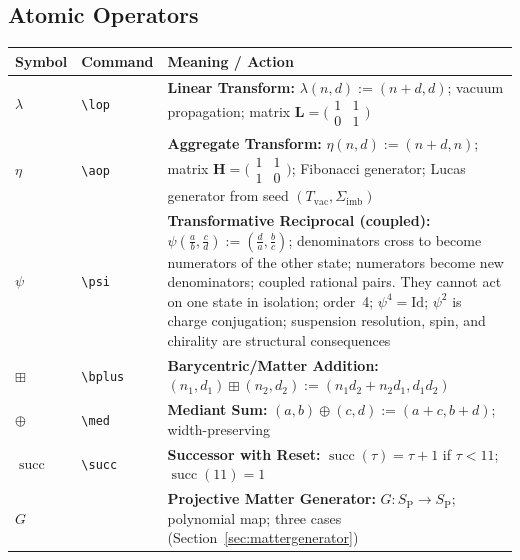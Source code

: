 \documentclass[11pt, letterpaper]{article}
\newcommand{\SP}{S_{\mathrm{P}}}
\newcommand{\lop}{\lambda}
\newcommand{\aop}{\eta}
\newcommand{\bplus}{\boxplus}
\newcommand{\med}{\oplus}
\renewcommand{\succ}{\operatorname{succ}}
\newcommand{\Sigimb}{\Sigma_{\mathrm{imb}}}
\theoremstyle{definition}
\theoremstyle{plain}
\begin{document}
\subsection{Atomic Operators}

\begin{longtable}{L{2.0cm} L{2.6cm} L{8.5cm}}
\toprule
\textbf{Symbol} & \textbf{Command} & \textbf{Meaning / Action} \\
\midrule\endhead\bottomrule\endfoot

$\lop$ & \verb|\lop| & \textbf{Linear Transform:}
  $\lop(n,d):=(n+d,d)$; vacuum propagation;
  matrix $\mathbf{L}=\bigl(\begin{smallmatrix}1&1\\0&1\end{smallmatrix}\bigr)$
  \\[3pt]

$\aop$ & \verb|\aop| & \textbf{Aggregate Transform:}
  $\aop(n,d):=(n+d,n)$;
  matrix $\mathbf{H}=\bigl(\begin{smallmatrix}1&1\\1&0\end{smallmatrix}\bigr)$;
  Fibonacci generator; Lucas generator from seed $(T_{\mathrm{vac}},\Sigimb)$
  \\[3pt]

$\psi$ & \verb|\psi| & \textbf{Transformative Reciprocal (coupled):}
  $\psi\!\left(\tfrac{a}{b},\tfrac{c}{d}\right):=\left(\tfrac{d}{a},\tfrac{b}{c}\right)$;
  denominators cross to become numerators of the other state;
  numerators become new denominators;
  coupled rational pairs. They cannot act on one state in isolation;
  order~4; $\psi^4=\mathrm{Id}$; $\psi^2$ is charge conjugation;
  suspension resolution, spin, and chirality are structural consequences \\[3pt]


$\bplus$ & \verb|\bplus| & \textbf{Barycentric/Matter Addition:}
  $(n_1,d_1)\bplus(n_2,d_2):=(n_1 d_2+n_2 d_1,d_1 d_2)$ \\[3pt]

$\med$ & \verb|\med| & \textbf{Mediant Sum:}
  $(a,b)\med(c,d):=(a+c,b+d)$; width-preserving \\[3pt]

$\succ$ & \verb|\succ| & \textbf{Successor with Reset:}
  $\succ(\tau)=\tau+1$ if $\tau<11$; $\succ(11)=1$ \\[3pt]

$G$ & & \textbf{Projective Matter Generator:}
  $G:\SP\to\SP$; polynomial map; three cases (Section~\ref{sec:mattergenerator})
  \\[3pt]


\end{longtable}
\end{document}
